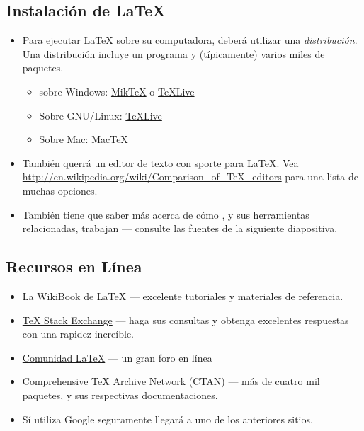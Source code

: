 \documentclass{beamer}
\begin{document}
\subsection{Instalación de  \LaTeX{}}
\begin{frame}{\insertsubsection}
  \begin{itemize}
  \item Para ejecutar \LaTeX{} sobre su computadora, deberá utilizar
    una \emph{distribución}. Una distribución incluye un
    programa  y (típicamente) varios miles de paquetes.
    \begin{itemize}
    \item sobre Windows: \href{http://miktex.org/}{Mik\TeX} o \href{http://tug.org/texlive/}{\TeX Live}
    \item Sobre GNU/Linux: \href{http://tug.org/texlive/}{\TeX Live}
    \item Sobre Mac: \href{http://tug.org/mactex/}{Mac\TeX}
    \end{itemize}
  \item También querrá un editor de texto con sporte para
\LaTeX{}. Vea
\url{http://en.wikipedia.org/wiki/Comparison_of_TeX_editors} para una
lista de muchas opciones.
  \item También tiene que saber más acerca de cómo  , y sus
    herramientas relacionadas, trabajan --- consulte las fuentes de la
    siguiente diapositiva. 
  \end{itemize}
\end{frame}

\subsection{Recursos en Línea}
\begin{frame}{\insertsubsection}
  \begin{itemize}
  \item \href{http://en.wikibooks.org/wiki/LaTeX}{La WikiBook de
      \LaTeX{}} --- excelente tutoriales y materiales de referencia.
  \item \href{http://tex.stackexchange.com/}{\TeX{} Stack Exchange} ---
    haga sus consultas y obtenga excelentes respuestas con una rapidez
    increíble.
  \item \href{http://www.latex-community.org/}{Comunidad \LaTeX{}} ---
    un gran foro en línea
  \item \href{http://ctan.org/}{Comprehensive \TeX{} Archive Network (CTAN)} ---
    más de cuatro mil paquetes, y sus respectivas documentaciones.
  \item Sí utiliza Google seguramente llegará  a uno de los anteriores sitios.
  \end{itemize}
\end{frame}
\end{document}

